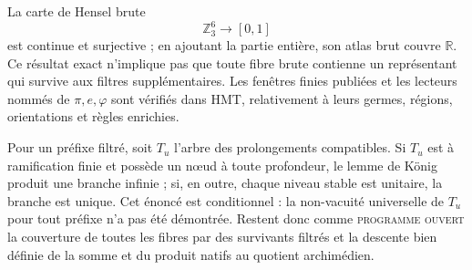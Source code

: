 La carte de Hensel brute
\[
\mathbb Z_3^6\longrightarrow[0,1]
\]
est continue et surjective ; en ajoutant la partie entière, son atlas brut couvre
\(\mathbb R\). Ce résultat exact n'implique pas que toute fibre brute contienne
un représentant qui survive aux filtres supplémentaires. Les fenêtres
finies publiées et les lecteurs nommés de \(\pi,e,\varphi\) sont vérifiés
dans HMT, relativement à leurs germes, régions,
orientations et règles enrichies.

\ifdefined\HMTInternalTraceability
Pour un préfixe filtré, soit \(T_u\) l'arbre des prolongements compatibles.
Si \(T_u\) est à ramification finie et possède un nœud à toute profondeur, le
lemme de König produit une branche infinie ; si, en outre, chaque niveau stable est
unitaire, la branche est unique. Cet énoncé est conditionnel : la non-vacuité universelle de \(T_u\)
pour tout préfixe n'a pas été démontrée. Restent donc
comme \textsc{programme ouvert} la couverture de toutes les fibres par des
survivants filtrés et la descente bien définie de la somme et du produit
natifs au quotient archimédien.
\fi
